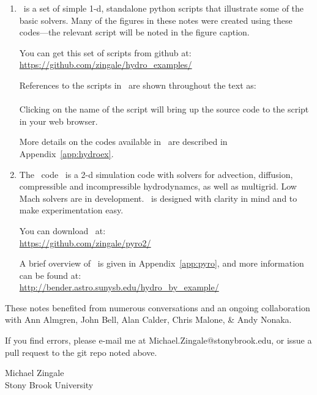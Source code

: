 \begin{enumerate}
\item \hydroex\ is a set of simple 1-d, standalone python scripts
  that illustrate some of the basic solvers.  Many of the figures
  in these notes were created using these codes---the relevant
  script will be noted in the figure caption.  

  You can get this set of scripts from github at:\\
  \url{https://github.com/zingale/hydro_examples/}

  References to the scripts in \hydroex\ are shown throughout
  the text as: \\[0.5em]
   \\[0.5em]
  Clicking on the name of the script will bring up the source code
  to the script in your web browser.

  More details on the codes available in \hydroex\ are described
  in Appendix~\ref{app:hydroex}.

\item  
  The \pyro\ code~\cite{pyro} is a 2-d simulation code with
  solvers for advection, diffusion, compressible and incompressible
  hydrodynamcs, as well as multigrid.  Low Mach solvers are 
  in development.  \pyro\ is designed with clarity in mind and to make 
  experimentation easy.  

  You can download \pyro\ at: \\
  \url{https://github.com/zingale/pyro2/} 

  A brief overview of \pyro\ is given in Appendix~\ref{app:pyro},
  and more information can be found at: \\
\url{http://bender.astro.sunysb.edu/hydro_by_example/}
\end{enumerate}

These notes benefited from numerous conversations and an ongoing
collaboration with Ann Almgren, John Bell, Alan Calder, Chris
Malone, \& Andy Nonaka.

If you find errors, please e-mail me at Michael.Zingale@stonybrook.edu,
or issue a pull request to the git repo noted above.

\begin{flushright}
Michael Zingale \\
Stony Brook University
\end{flushright}
